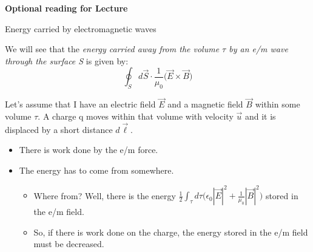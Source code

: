 
\begin{frame}[plain,c]
\begin{center}
{\Huge \bf Optional reading for Lecture \thislecture}
\end{center}
\end{frame}


%
%
%
%

\begin{frame}{Energy carried by electromagnetic waves}

We will see that the  {\em energy carried away from the volume $\tau$ by an e/m wave
through the surface S} is given by:
\begin{equation*}
     \oint_{S} d\vec{S} \cdot \frac{1}{\mu_0} \Big( \vec{E} \times \vec{B} \Big)
\end{equation*}

\vspace{0.3cm}

Let's assume that I have an electric field $\vec{E}$ and a magnetic field $\vec{B}$ within some volume $\tau$.
A charge q moves within that volume with velocity $\vec{u}$ and it is displaced by a short distance $d\vec{\ell}$.
\begin{itemize}
   \item There is work done by the e/m force.
   \item The energy has to come from somewhere.
       \begin{itemize}
            \item Where from? Well, there is the energy
                      $\displaystyle \frac{1}{2} \int_{\tau} d\tau \Big( \epsilon_0 |\vec{E}|^2 + \frac{1}{\mu_0} |\vec{B}|^2 \Big)$
                      stored in the e/m field.
             \item So, if there is work done on the charge, the energy stored in the e/m field must be decreased.
       \end{itemize}
\end{itemize}

\end{frame}

%
%
%
%

